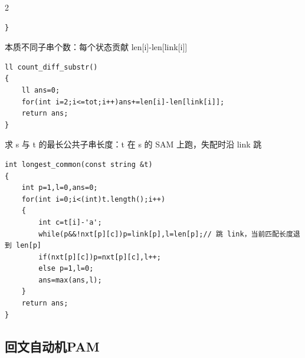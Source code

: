 \documentclass[UTF8,fontset=fandol,a4paper,twoside]{ctexart}
\newcommand{\note}[1]{{\fontsize{10}{12}\selectfont #1\par}}
\begin{document}
\begin{multicols}{2}
\begin{lstlisting}
}
\end{lstlisting}
\note{本质不同子串个数：每个状态贡献 len[\allowbreak{}i]\allowbreak{}-\allowbreak{}len[\allowbreak{}link[\allowbreak{}i]\allowbreak{}]\allowbreak{}}
\begin{lstlisting}
ll count_diff_substr()
{
    ll ans=0;
    for(int i=2;i<=tot;i++)ans+=len[i]-len[link[i]];
    return ans;
}
\end{lstlisting}
\note{求 s 与 t 的最长公共子串长度：t 在 s 的 SAM 上跑，失配时沿 link 跳}
\begin{lstlisting}
int longest_common(const string &t)
{
    int p=1,l=0,ans=0;
    for(int i=0;i<(int)t.length();i++)
    {
        int c=t[i]-'a';
        while(p&&!nxt[p][c])p=link[p],l=len[p];// 跳 link，当前匹配长度退到 len[p]
        if(nxt[p][c])p=nxt[p][c],l++;
        else p=1,l=0;
        ans=max(ans,l);
    }
    return ans;
}
\end{lstlisting}
\subsection{回文自动机PAM}


\end{multicols}
\end{document}

